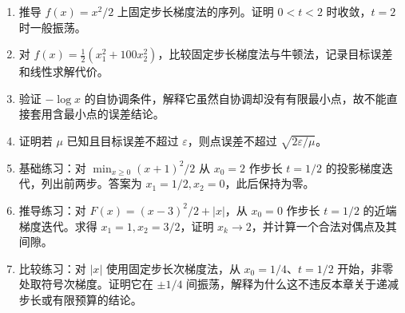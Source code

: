 \begin{enumerate}
 \item 推导 $f(x)=x^2/2$ 上固定步长梯度法的序列。证明 $0<t<2$ 时收敛，$t=2$ 时一般振荡。
 \item 对 $f(x)=\tfrac12(x_1^2+100x_2^2)$，比较固定步长梯度法与牛顿法，记录目标误差和线性求解代价。
 \item 验证 $-\log x$ 的自协调条件，解释它虽然自协调却没有有限最小点，故不能直接套用含最小点的误差结论。
 \item 证明若 $\mu$ 已知且目标误差不超过 $\varepsilon$，则点误差不超过 $\sqrt{2\varepsilon/\mu}$。
 \item 基础练习：对 $\min_{x\geq0}(x+1)^2/2$ 从 $x_0=2$ 作步长 $t=1/2$ 的投影梯度迭代，列出前两步。答案为 $x_1=1/2,x_2=0$，此后保持为零。
 \item 推导练习：对 $F(x)=(x-3)^2/2+|x|$，从 $x_0=0$ 作步长 $t=1/2$ 的近端梯度迭代。求得 $x_1=1,x_2=3/2$，证明 $x_k\to2$，并计算一个合法对偶点及其间隙。
 \item 比较练习：对 $|x|$ 使用固定步长次梯度法，从 $x_0=1/4$、$t=1/2$ 开始，非零处取符号次梯度。证明它在 $\pm1/4$ 间振荡，解释为什么这不违反本章关于递减步长或有限预算的结论。
\end{enumerate}

